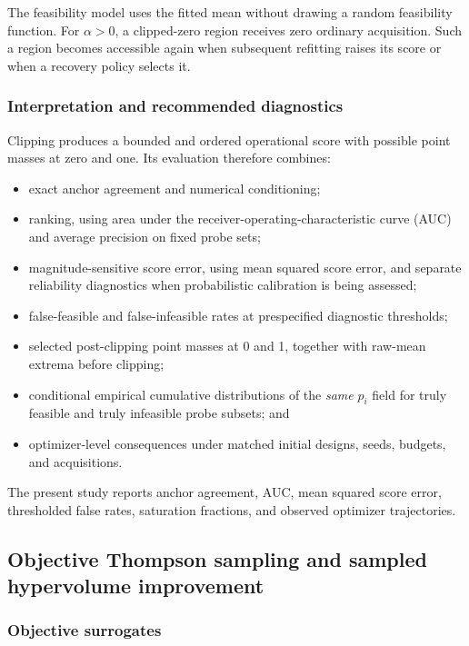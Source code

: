 \documentclass[twoside]{article}
\begin{document}
The feasibility model uses the fitted mean without drawing a random
feasibility function. For \(\alpha>0\), a clipped-zero region receives zero
ordinary acquisition. Such a region becomes accessible again when subsequent
refitting raises its score or when a recovery policy selects it.

\subsubsection{Interpretation and recommended diagnostics}
\label{sec:feasibility-field-diagnostics}

Clipping produces a bounded and ordered operational score with possible point
masses at zero and one. Its evaluation therefore combines:

\begin{itemize}
  \item exact anchor agreement and numerical conditioning;
  \item ranking, using area under the receiver-operating-characteristic curve
  (AUC) and average precision on fixed probe sets;
  \item magnitude-sensitive score error, using mean squared score error, and
  separate reliability diagnostics when probabilistic calibration is being
  assessed;
  \item false-feasible and false-infeasible rates at prespecified diagnostic
  thresholds;
  \item selected post-clipping point masses at 0 and 1, together with
  raw-mean extrema before clipping;
  \item conditional empirical cumulative distributions of the \emph{same}
  \(p_i\) field for truly feasible and truly infeasible probe subsets; and
  \item optimizer-level consequences under matched initial designs, seeds,
  budgets, and acquisitions.
\end{itemize}

The present study reports anchor agreement, AUC, mean squared score error,
thresholded false rates, saturation fractions, and observed optimizer
trajectories.

\subsection{Objective Thompson sampling and sampled hypervolume improvement}

\subsubsection{Objective surrogates}
\end{document}
